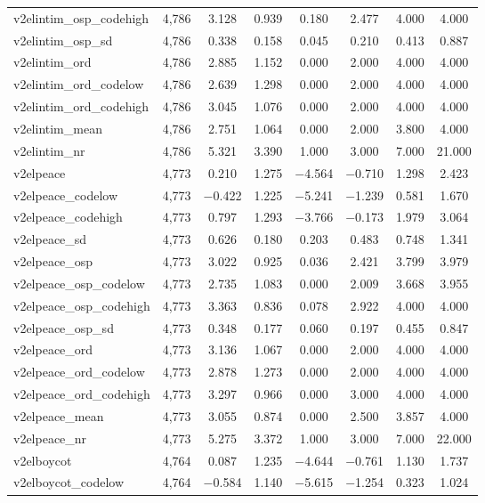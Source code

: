 \begin{table}[!htbp]
\begin{tabular}{@{\extracolsep{5pt}}lccccccc}
v2elintim\_osp\_codehigh & 4,786 & 3.128 & 0.939 & 0.180 & 2.477 & 4.000 & 4.000 \\ 
v2elintim\_osp\_sd & 4,786 & 0.338 & 0.158 & 0.045 & 0.210 & 0.413 & 0.887 \\ 
v2elintim\_ord & 4,786 & 2.885 & 1.152 & 0.000 & 2.000 & 4.000 & 4.000 \\ 
v2elintim\_ord\_codelow & 4,786 & 2.639 & 1.298 & 0.000 & 2.000 & 4.000 & 4.000 \\ 
v2elintim\_ord\_codehigh & 4,786 & 3.045 & 1.076 & 0.000 & 2.000 & 4.000 & 4.000 \\ 
v2elintim\_mean & 4,786 & 2.751 & 1.064 & 0.000 & 2.000 & 3.800 & 4.000 \\ 
v2elintim\_nr & 4,786 & 5.321 & 3.390 & 1.000 & 3.000 & 7.000 & 21.000 \\ 
v2elpeace & 4,773 & 0.210 & 1.275 & $-$4.564 & $-$0.710 & 1.298 & 2.423 \\ 
v2elpeace\_codelow & 4,773 & $-$0.422 & 1.225 & $-$5.241 & $-$1.239 & 0.581 & 1.670 \\ 
v2elpeace\_codehigh & 4,773 & 0.797 & 1.293 & $-$3.766 & $-$0.173 & 1.979 & 3.064 \\ 
v2elpeace\_sd & 4,773 & 0.626 & 0.180 & 0.203 & 0.483 & 0.748 & 1.341 \\ 
v2elpeace\_osp & 4,773 & 3.022 & 0.925 & 0.036 & 2.421 & 3.799 & 3.979 \\ 
v2elpeace\_osp\_codelow & 4,773 & 2.735 & 1.083 & 0.000 & 2.009 & 3.668 & 3.955 \\ 
v2elpeace\_osp\_codehigh & 4,773 & 3.363 & 0.836 & 0.078 & 2.922 & 4.000 & 4.000 \\ 
v2elpeace\_osp\_sd & 4,773 & 0.348 & 0.177 & 0.060 & 0.197 & 0.455 & 0.847 \\ 
v2elpeace\_ord & 4,773 & 3.136 & 1.067 & 0.000 & 2.000 & 4.000 & 4.000 \\ 
v2elpeace\_ord\_codelow & 4,773 & 2.878 & 1.273 & 0.000 & 2.000 & 4.000 & 4.000 \\ 
v2elpeace\_ord\_codehigh & 4,773 & 3.297 & 0.966 & 0.000 & 3.000 & 4.000 & 4.000 \\ 
v2elpeace\_mean & 4,773 & 3.055 & 0.874 & 0.000 & 2.500 & 3.857 & 4.000 \\ 
v2elpeace\_nr & 4,773 & 5.275 & 3.372 & 1.000 & 3.000 & 7.000 & 22.000 \\ 
v2elboycot & 4,764 & 0.087 & 1.235 & $-$4.644 & $-$0.761 & 1.130 & 1.737 \\ 
v2elboycot\_codelow & 4,764 & $-$0.584 & 1.140 & $-$5.615 & $-$1.254 & 0.323 & 1.024 \\ 

\end{tabular}
\end{table}
